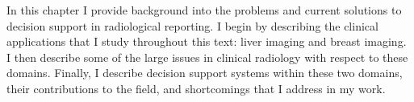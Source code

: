 In this chapter I provide background into the problems and current solutions to decision support in radiological reporting. I begin by describing the clinical applications that I study throughout this text: liver imaging and breast imaging. I then describe some of the large issues in clinical radiology with respect to these domains. Finally, I describe decision support systems within these two domains, their contributions to the field, and shortcomings that I address in my work.